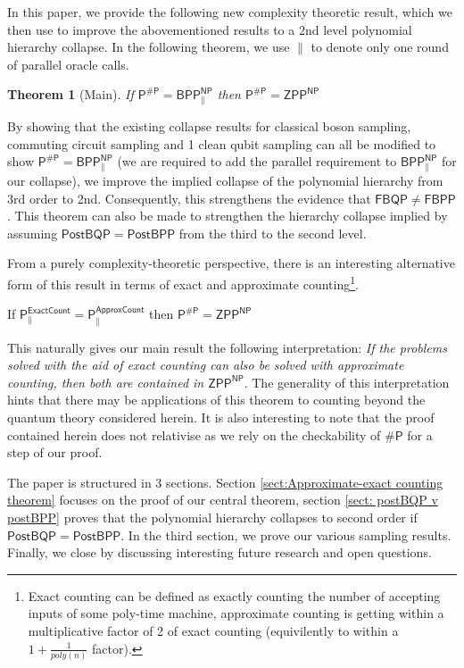 \documentclass{article}
\newtheorem*{theorem*}{Theorem}
\begin{document}
In this paper, we provide the following new complexity theoretic result, which we then use to improve the abovementioned results to a 2nd level polynomial hierarchy collapse. In the following theorem, we use $\parallel$ to denote only one round of parallel oracle calls.
\begin{theorem*}[Main]
    If $\mathsf{P^{\#P}}=\mathsf{BPP_{\parallel}^{NP}}$ then $\mathsf{P^{\#P}=ZPP^{NP}}$
\end{theorem*}
By showing that the existing collapse results for classical boson sampling, commuting circuit sampling and 1 clean qubit sampling can all be modified to show $\mathsf{P^{\#P}}=\mathsf{BPP_{\parallel}^{NP}}$ (we are required to add the parallel requirement to $\mathsf{BPP^{NP}_{\parallel}}$ for our collapse), we improve the implied collapse of the polynomial hierarchy from 3rd order to 2nd. Consequently, this strengthens the evidence that $\mathsf{FBQP \neq FBPP}$. 
This theorem can also be made to strengthen the hierarchy collapse implied by assuming $\mathsf{PostBQP=PostBPP}$ from the third to the second level.

From a purely complexity-theoretic perspective, there is an interesting alternative form of this result in terms of exact and approximate counting\footnote{Exact counting can be defined as exactly counting the number of accepting inputs of some poly-time machine, approximate counting is getting within a multiplicative factor of 2 of exact counting (equivilently to within a $1+\frac{1}{poly(n)}$ factor).}.
\begin{center}
If $\mathsf{P^{ExactCount}_{\parallel}}=\mathsf{P^{ApproxCount}_{\parallel}}$ then $\mathsf{P^{\# P }=ZPP^{NP}}$
\end{center}
This naturally gives our main result the following interpretation: \textit{If the problems solved with the aid of exact counting can also be solved with approximate counting, then both are contained in $\mathsf{ZPP^{NP}}$}. 
The generality of this interpretation hints that there may be applications of this theorem to counting beyond the quantum theory considered herein.
It is also interesting to note that the proof contained herein does not relativise as we rely on the checkability of $\mathsf{\# P}$ for a step of our proof.


The paper is structured in 3 sections. Section \ref{sect:Approximate-exact counting theorem} focuses on the proof of our central theorem, section \ref{sect: postBQP v postBPP} proves that the polynomial hierarchy collapses to second order if $\mathsf{PostBQP=PostBPP}$. In the third section, we prove our various sampling results. Finally, we close by discussing interesting future research and open questions.
\end{document}
